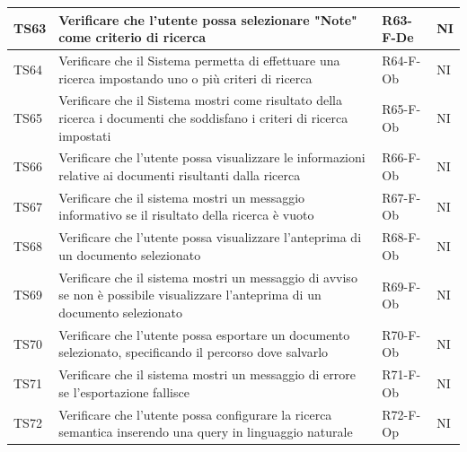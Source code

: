 \documentclass[a4paper,12pt]{article}
\begin{document}
\begin{longtable}{|M{1.2cm}|M{6.3cm}|M{2.5cm}|M{1.5cm}|}
                TS63 & Verificare che l'utente possa selezionare "Note" come criterio di ricerca & R63-F-De & NI \\
                \hline
                                
                TS64 & Verificare che il Sistema permetta di effettuare una ricerca impostando uno o più criteri di ricerca & R64-F-Ob & NI \\
                \hline
                                
                TS65 & Verificare che il Sistema mostri come risultato della ricerca i documenti che soddisfano i criteri di ricerca impostati& R65-F-Ob & NI \\
                \hline
                                
                TS66 & Verificare che l'utente possa visualizzare le informazioni relative ai documenti risultanti dalla ricerca & R66-F-Ob & NI \\
                \hline
                                
                TS67 & Verificare che il sistema mostri un messaggio informativo se il risultato della ricerca è vuoto & R67-F-Ob & NI \\
                \hline
                                
                TS68 & Verificare che l'utente possa visualizzare l'anteprima di un documento selezionato & R68-F-Ob & NI \\
                \hline
                                
                TS69 & Verificare che il sistema mostri un messaggio di avviso se non è possibile visualizzare l'anteprima di un documento selezionato & R69-F-Ob & NI \\
                \hline
                                
                TS70 & Verificare che l'utente possa esportare un documento selezionato, specificando il percorso dove salvarlo & R70-F-Ob & NI \\
                \hline
                                
                TS71 & Verificare che il sistema mostri un messaggio di errore se l'esportazione fallisce & R71-F-Ob & NI \\
                \hline
                                
                TS72 & Verificare che l'utente possa configurare la ricerca semantica inserendo una query in linguaggio naturale & R72-F-Op & NI \\
                \hline
                                

\end{longtable}
\end{document}
